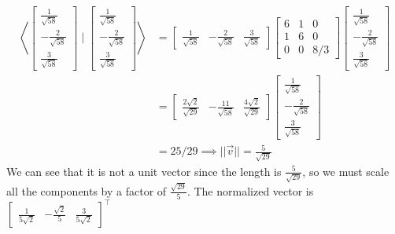 \documentclass{report}
\begin{document}
$$
\begin{aligned}
\left\langle
\begin{bmatrix}\frac{1}{\sqrt{58}}\\-\frac{2}{\sqrt{58}}\\\frac{3}{\sqrt{58}}\end{bmatrix}
\mid
\begin{bmatrix}\frac{1}{\sqrt{58}}\\-\frac{2}{\sqrt{58}}\\\frac{3}{\sqrt{58}}\end{bmatrix}
\right\rangle &= \begin{bmatrix}\frac{1}{\sqrt{58}}&-\frac{2}{\sqrt{58}}&\frac{3}{\sqrt{58}}\end{bmatrix}\begin{bmatrix}
6 & 1 & 0 \\
1 & 6 & 0 \\
0 & 0 & 8 / 3
\end{bmatrix}\begin{bmatrix}\frac{1}{\sqrt{58}}\\-\frac{2}{\sqrt{58}}\\\frac{3}{\sqrt{58}}\end{bmatrix}\\
&=\begin{bmatrix}\frac{2\sqrt{2}}{\sqrt{29}}&-\frac{11}{\sqrt{58}}&\frac{4\sqrt{2}}{\sqrt{29}}\end{bmatrix}\begin{bmatrix}\frac{1}{\sqrt{58}}\\-\frac{2}{\sqrt{58}}\\\frac{3}{\sqrt{58}}\end{bmatrix}\\
&=25/29 \implies ||\vec{v}|| = \frac{5}{\sqrt{29}}
\end{aligned}
$$
We can see that it is not a unit vector since the length is $\frac{5}{\sqrt{29}}$,  so we must scale all the components by a factor of $\frac{\sqrt{29}}{5}$.  The normalized vector is $\begin{bmatrix}\frac{1}{5\sqrt{2}}&-\frac{\sqrt{2}}{5}&\frac{3}{5\sqrt{2}}\end{bmatrix}^\top$
\end{document}
